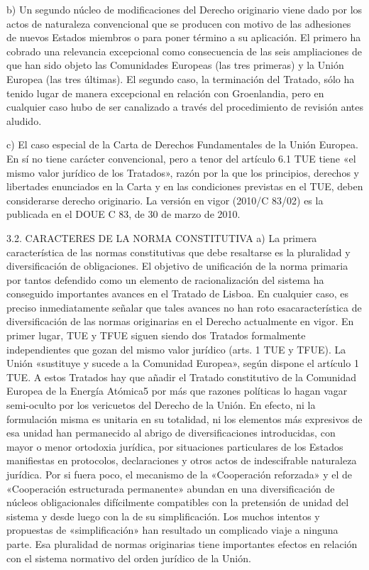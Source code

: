 \documentclass[10pt,a4paper]{article}
\begin{document}
b) Un segundo núcleo de modificaciones del Derecho originario viene dado por los actos de naturaleza convencional que se producen con motivo de las adhesiones de nuevos Estados miembros o para poner término a su aplicación. El primero ha cobrado una relevancia excepcional como consecuencia de las seis ampliaciones de que han sido objeto las Comunidades Europeas (las tres primeras) y la Unión Europea (las tres últimas). El segundo caso, la terminación del Tratado, sólo ha tenido lugar de manera excepcional en relación con Groenlandia, pero en cualquier caso hubo de ser canalizado a través del procedimiento de revisión antes aludido.

c) El caso especial de la Carta de Derechos Fundamentales de la Unión Europea. En sí no tiene carácter convencional, pero a tenor del artículo 6.1 TUE tiene «el mismo valor jurídico de los Tratados»,  razón por la que los principios, derechos y libertades enunciados en la Carta y en las condiciones previstas en el TUE, deben considerarse derecho originario. La versión en vigor (2010/C 83/02) es la publicada en el DOUE C 83, de 30 de marzo de 2010.

3.2. CARACTERES DE LA NORMA CONSTITUTIVA
a) La primera característica de las normas constitutivas que debe resaltarse es la pluralidad y diversificación de obligaciones. El objetivo de unificación de la norma primaria por tantos defendido como un elemento de racionalización del sistema ha conseguido importantes avances en el Tratado de Lisboa. En cualquier caso, es preciso inmediatamente señalar que tales avances no han roto esacaracterística de diversificación de las normas originarias en el Derecho actualmente en vigor. En primer lugar, TUE y TFUE siguen siendo dos Tratados formalmente independientes que gozan del mismo valor jurídico (arts. 1 TUE y TFUE). La Unión «sustituye y sucede a la Comunidad Europea», según dispone el artículo 1 TUE. A estos Tratados hay que añadir el Tratado constitutivo de la Comunidad Europea de la Energía Atómica5 por más que razones políticas lo hagan vagar semi-oculto por los vericuetos del Derecho de la Unión. En efecto, ni la formulación misma es unitaria en su totalidad, ni los elementos más expresivos de esa unidad han permanecido al abrigo de diversificaciones introducidas, con mayor o menor ortodoxia jurídica, por situaciones particulares de los Estados manifiestas en protocolos, declaraciones y otros actos de indescifrable naturaleza jurídica. Por si fuera poco, el mecanismo de la «Cooperación reforzada» y el de «Cooperación estructurada permanente» abundan en una diversificación de núcleos obligacionales difícilmente compatibles con la pretensión de unidad del sistema y desde luego con la de su simplificación. Los muchos intentos y propuestas de «simplificación» han resultado un complicado viaje a ninguna parte. Esa pluralidad de normas originarias tiene importantes efectos en relación con el sistema normativo del orden jurídico de la Unión.
\end{document}
